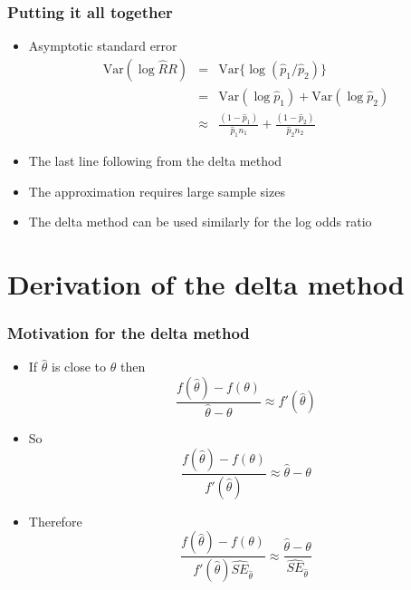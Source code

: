 \documentclass[aspectratio=169]{beamer}
\newcommand{\Var}{\mathrm{Var}}
\begin{document}
\begin{frame}\frametitle{Putting it all together}
  \begin{itemize}
  \item Asymptotic standard error
    \begin{eqnarray*}
      \Var(\log \hat RR)
      & = & \Var\{\log(\hat p_1 / \hat p_2)\} \\
      & = & \Var(\log \hat p_1) + \Var(\log \hat p_2)  \\
      & \approx & \frac{(1 - \hat p_1)}{\hat p_1 n_1} + \frac{(1 - \hat p_2)}{ \hat p_2 n_2}
    \end{eqnarray*}
  \item The last line following from the delta method
  \item The approximation requires large sample sizes
  \item The delta method can be used similarly for the log odds ratio
  \end{itemize}
\end{frame}

\section{Derivation of the delta method}
\begin{frame}\frametitle{Motivation for the delta method}
  \begin{itemize}
  \item If $\hat \theta$ is close to $\theta$ then
    $$
    \frac{f(\hat \theta) - f(\theta)}{\hat \theta - \theta} \approx f'(\hat\theta) 
    $$
  \item So
    $$
    \frac{f(\hat \theta) - f(\theta)}{f'(\hat \theta)} \approx \hat \theta - \theta
    $$
  \item Therefore
    $$
    \frac{f(\hat \theta) - f(\theta)}{f'(\hat \theta)\hat{SE}_{\hat \theta}} \approx  
    \frac{\hat \theta - \theta}{\hat{SE}_{\hat \theta}}
    $$
  \end{itemize}
\end{frame}
\end{document}

